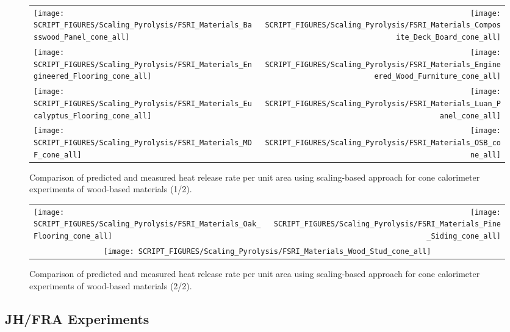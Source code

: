\begin{figure}[p]
\begin{tabular*}{\textwidth}{l@{\extracolsep{\fill}}r}
\texttt{[image: SCRIPT\_FIGURES/Scaling\_Pyrolysis/FSRI\_Materials\_Basswood\_Panel\_cone\_all]} &
\texttt{[image: SCRIPT\_FIGURES/Scaling\_Pyrolysis/FSRI\_Materials\_Composite\_Deck\_Board\_cone\_all]} \\
\texttt{[image: SCRIPT\_FIGURES/Scaling\_Pyrolysis/FSRI\_Materials\_Engineered\_Flooring\_cone\_all]} &
\texttt{[image: SCRIPT\_FIGURES/Scaling\_Pyrolysis/FSRI\_Materials\_Engineered\_Wood\_Furniture\_cone\_all]} \\
\texttt{[image: SCRIPT\_FIGURES/Scaling\_Pyrolysis/FSRI\_Materials\_Eucalyptus\_Flooring\_cone\_all]} &
\texttt{[image: SCRIPT\_FIGURES/Scaling\_Pyrolysis/FSRI\_Materials\_Luan\_Panel\_cone\_all]} \\
\texttt{[image: SCRIPT\_FIGURES/Scaling\_Pyrolysis/FSRI\_Materials\_MDF\_cone\_all]} &
\texttt{[image: SCRIPT\_FIGURES/Scaling\_Pyrolysis/FSRI\_Materials\_OSB\_cone\_all]} \\
\end{tabular*}
\caption[HRRPUA of FSRI materials using scaling model, wood-based materials]
{Comparison of predicted and measured heat release rate per unit area using scaling-based approach for cone calorimeter experiments of wood-based materials (1/2).}
\label{FSRI_Materials_woods1}
\end{figure}

\begin{figure}[p]
\begin{tabular*}{\textwidth}{l@{\extracolsep{\fill}}r}
\texttt{[image: SCRIPT\_FIGURES/Scaling\_Pyrolysis/FSRI\_Materials\_Oak\_Flooring\_cone\_all]} &
\texttt{[image: SCRIPT\_FIGURES/Scaling\_Pyrolysis/FSRI\_Materials\_Pine\_Siding\_cone\_all]} \\
 \multicolumn{2}{c}{\texttt{[image: SCRIPT\_FIGURES/Scaling\_Pyrolysis/FSRI\_Materials\_Wood\_Stud\_cone\_all]}}
\end{tabular*}
\caption[HRRPUA of FSRI materials using scaling model, wood-based materials]
{Comparison of predicted and measured heat release rate per unit area using scaling-based approach for cone calorimeter experiments of wood-based materials (2/2).}
\label{FSRI_Materials_woods2}
\end{figure}

\clearpage

\subsection{JH/FRA Experiments}\label{sec_JH_FRA_Materials}

